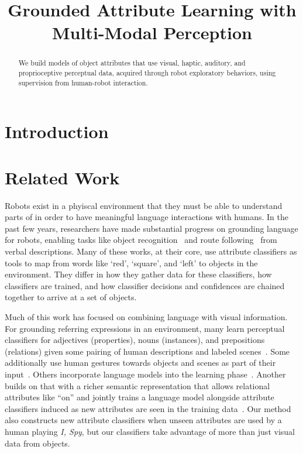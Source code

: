\documentclass{article}
\title{Grounded Attribute Learning with Multi-Modal Perception}
\begin{document}
\maketitle

\begin{abstract}
	We build models of object attributes that use visual, haptic, auditory, and proprioceptive perceptual data, acquired through robot exploratory behaviors, using supervision from human-robot interaction.
\end{abstract}

\section{Introduction}

\section{Related Work}

	Robots exist in a phyiscal environment that they must be able to understand parts of in order to have meaningful language interactions with humans. In the past few years, researchers have made substantial progress on grounding language for robots, enabling tasks like object recognition~\cite{liu:acl14} and route following~\cite{kollar:hri10} from verbal descriptions. Many of these works, at their core, use attribute classifiers as tools to map from words like `red', `square', and `left' to objects in the environment. They differ in how they gather data for these classifiers, how classifiers are trained, and how classifier decisions and confidences are chained together to arrive at a set of objects.

	Much of this work has focused on combining language with visual information. For grounding referring expressions in an environment, many learn perceptual classifiers for adjectives (properties), nouns (instances), and prepositions (relations) given some pairing of human descriptions and labeled scenes~\cite{dindo:iros10,sun:icra13,malinowski:nips14,mohan:acs13}. Some additionally use human gestures towards objects and scenes as part of their input~\cite{matuszek:aaai14}. Others incorporate language models into the learning phase~\cite{perera:aaai13,spranger:ijcai15,matuszek:icml12}. Another builds on that with a richer semantic representation that allows relational attributes like ``on'' and jointly trains a language model alongside attribute classifiers induced as new attributes are seen in the training data~\cite{krishnamurthy:acl13}. Our method also constructs new attribute classifiers when unseen attributes are used by a human playing \textit{I, Spy}, but our classifiers take advantage of more than just visual data from objects.
\end{document}
